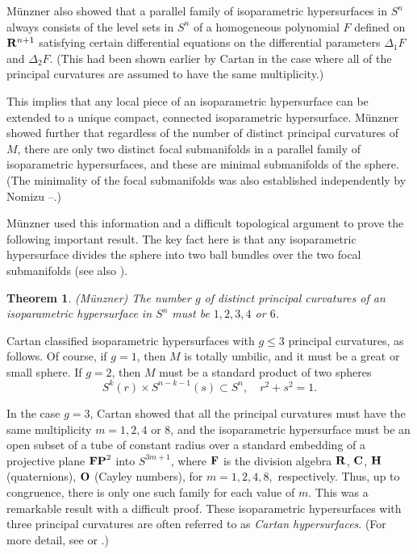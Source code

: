 \documentclass[12pt]{article}
\newtheorem{theorem}{Theorem}[section]
\begin{document}
M\"{u}nzner also showed that a
parallel family of isoparametric hypersurfaces in $S^n$ always
consists of the level sets in $S^n$ of a homogeneous polynomial $F$
defined on ${\bf R}^{n+1}$ satisfying certain differential equations on the
differential parameters $\Delta_1 F$ and $\Delta_2 F$. 
(This had been shown earlier by Cartan \cite{Car2} in the case where all of the
principal curvatures are assumed to have the same multiplicity.)

This implies that any local piece
of an isoparametric hypersurface can be extended to a unique
compact, connected isoparametric hypersurface.  M\"{u}nzner  showed further that
regardless of the number of distinct principal curvatures
of $M$, there are only two distinct focal submanifolds in a
parallel family of isoparametric hypersurfaces, and these are
minimal submanifolds of the sphere.  (The minimality of the
focal submanifolds was also established independently by Nomizu
\cite{Nom1}--\cite{Nom2}.) 

M\"{u}nzner  
used this information
and a difficult topological argument to prove the
following important result.  The key fact 
here is that any isoparametric hypersurface divides the sphere
into two ball bundles over the two focal submanifolds (see also \cite[pp. 131--137]{CR8}).

\begin{theorem}
\label{thm:munzner-g}
(M\"{u}nzner) The number $g$ of distinct principal curvatures of an isoparametric
hypersurface in $S^n$ must be $1,2,3,4$ or $6$.
\end{theorem}

Cartan classified isoparametric hypersurfaces with 
$g \leq 3$ principal curvatures, as follows.  Of course, if $g=1$,
then $M$ is totally umbilic, and it must be a great or small
sphere.  If $g=2$, then $M$ must be a standard product of two
spheres
\begin{displaymath}
S^k(r) \times S^{n-k-1}(s) \subset S^n, \quad r^2+s^2=1.
\end{displaymath}

In the case $g=3$, Cartan \cite{Car2}
showed that all the principal curvatures must have the same multiplicity
$m=1,2,4$ or 8, and the isoparametric hypersurface must be an open subset of a tube of
constant radius 
over a standard embedding of a projective
plane ${\bf FP}^2$ into $S^{3m+1}$,
where ${\bf F}$ is the division algebra
${\bf R}$, ${\bf C}$, ${\bf H}$ (quaternions),
${\bf O}$ (Cayley numbers), for $m=1,2,4,8,$ respectively.  Thus, up to
congruence, there is only one such family for each value of $m$.
This was a remarkable result with a difficult proof. These isoparametric
hypersurfaces with three principal curvatures are often referred to as
{\em Cartan hypersurfaces}.  (For more detail, see \cite[pp. 151--155]{CR8} or \cite{CR-cartans-examples}.)
\end{document}
